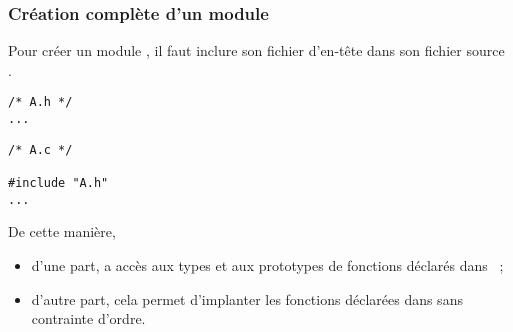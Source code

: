 \begin{frame}[fragile]
\frametitle{Création complète d'un module}
Pour créer un module , il faut inclure son fichier d'en-tête
 dans son fichier source .
\medskip

\begin{minipage}[c]{.3\textwidth}
\begin{lstlisting}[frame=single,numbers=none]
/* A.h */
...
\end{lstlisting}
\end{minipage}
\qquad \qquad
\begin{minipage}[c]{.3\textwidth}
\begin{lstlisting}[frame=single,numbers=none]
/* A.c */

#include "A.h"
...
\end{lstlisting}
\end{minipage}
\medskip

De cette manière,
\begin{itemize}
    \item d'une part,  a accès aux types et
    aux prototypes de fonctions déclarés dans ~;
    \smallskip

    \item d'autre part, cela permet d'implanter les fonctions déclarées
    dans  sans contrainte d'ordre.
\end{itemize}
\end{frame}

